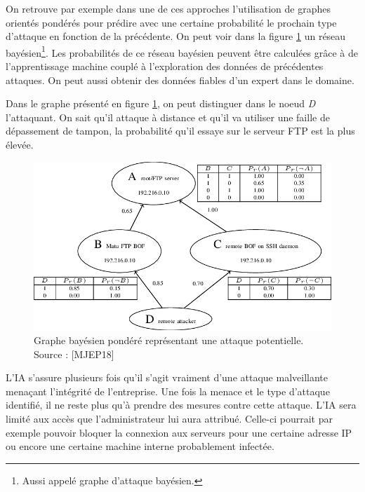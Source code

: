 \documentclass[a4paper, 12pt]{article}
\begin{document}
\begin{spacing}{1.1}
      On retrouve par exemple dans une de ces approches l’utilisation de graphes
      orientés pondérés pour prédire avec une certaine probabilité le prochain
      type d’attaque en fonction de la précédente. On peut voir dans la figure
      \ref{fig:1} un réseau bayésien\footnote{Aussi appelé graphe d'attaque
      bayésien.}. Les probabilités de ce réseau bayésien peuvent être calculées
      grâce à de l'apprentissage machine couplé à l'exploration des données de
      précédentes attaques. On peut aussi obtenir des données fiables d'un
      expert dans le domaine.

      Dans le graphe présenté en figure \ref{fig:1}, on peut distinguer dans le
      noeud \textit{D} l'attaquant. On sait qu'il attaque à distance et qu'il va
      utiliser une faille de dépassement de tampon, la probabilité qu'il essaye
      sur le serveur FTP est la plus élevée.

      \begin{figure}[h]
        \centering
        \includegraphics[scale=.5]{img/attackgraph.png}
        \caption{Graphe bayésien pondéré représentant une attaque potentielle.
        Source : [MJEP18]}
        \label{fig:1}
      \end{figure}

      L’IA s’assure plusieurs fois qu’il s’agit vraiment d’une attaque
      malveillante menaçant l’intégrité de l’entreprise. Une fois la menace et
      le type d’attaque identifié, il ne reste plus qu’à prendre des mesures
      contre cette attaque. L’IA sera limité aux accès que l’administrateur lui
      aura attribué. Celle-ci pourrait par exemple pouvoir bloquer la connexion
      aux serveurs pour une certaine adresse IP ou encore une certaine machine
      interne probablement infectée.


\end{spacing}
\end{document}
